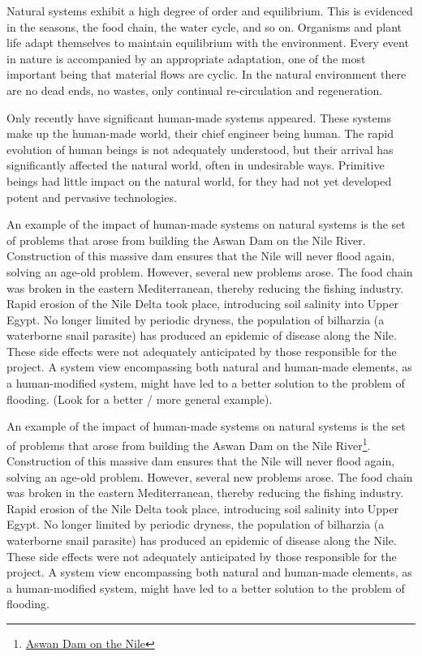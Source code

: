 Natural systems exhibit a high degree of order and equilibrium. This is evidenced in the seasons, the food chain, the water cycle, and so on. Organisms and plant life adapt themselves to maintain equilibrium with the environment. Every event in nature is accompanied by an appropriate adaptation, one of the most important being that material flows are cyclic. In the natural environment there are no dead ends, no wastes, only continual re-circulation and regeneration.

Only recently have significant human-made systems appeared. These systems make up the human-made world, their chief engineer being human. The rapid evolution of human beings is not adequately understood, but their arrival has significantly affected the natural world, often in undesirable ways. Primitive beings had little impact on the natural world, for they had not yet developed potent and pervasive technologies.

An example of the impact of human-made systems on natural systems is the set of problems that arose from building the Aswan Dam on the Nile River. Construction of this massive dam ensures that the Nile will never flood again, solving an age-old problem. However, several new problems arose. The food chain was broken in the eastern Mediterranean, thereby reducing the fishing industry. Rapid erosion of the Nile Delta took place, introducing soil salinity into Upper Egypt. No longer limited by periodic dryness, the population of bilharzia (a waterborne snail parasite) has produced an epidemic of disease along the Nile. These side effects were not adequately anticipated by those responsible for the project. A system view encompassing both natural and human-made elements, as a human-modified system, might have led to a better solution to the problem of flooding. (Look for a better / more general example).


An example of the impact of human-made systems on natural systems is the set of problems that arose from building the Aswan Dam on the Nile River\footnote{\href{http://www.edc.uri.edu/temp/ci/ciip/FallClass/Docs_2006/UrbanWaterfronts/Abu-Zeid\%20and\%20El-Shibini.pdf}{Aswan Dam on the Nile}}. Construction of this massive dam ensures that the Nile will never flood again, solving an age-old problem. However, several new problems arose. The food chain was broken in the eastern Mediterranean, thereby reducing the fishing industry. Rapid erosion of the Nile Delta took place, introducing soil salinity into Upper Egypt. No longer limited by periodic dryness, the population of bilharzia (a waterborne snail parasite) has produced an epidemic of disease along the Nile. These side effects were not adequately anticipated by those responsible for the project. A system view encompassing both natural and human-made elements, as a human-modified system, might have led to a better solution to the problem of flooding.


